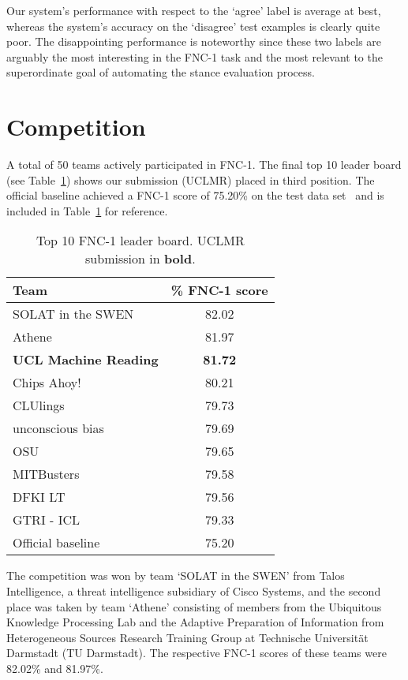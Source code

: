 \documentclass{article}
\begin{document}
Our system's performance with respect to the `agree' label is average at best, whereas the system's accuracy on the `disagree' test examples is clearly quite poor. The disappointing performance is noteworthy since these two labels are arguably the most interesting in the FNC-1 task and the most relevant to the superordinate goal of automating the stance evaluation process.

\section{Competition}
\label{comp}

A total of 50 teams actively participated in FNC-1. The final top 10 leader board (see Table~\ref{tab: leaderboard}) shows our submission (UCLMR) placed in third position. The official baseline achieved a FNC-1 score of 75.20\% on the test data set~\cite{fncbase} and is included in Table~\ref{tab: leaderboard} for reference.

\begin{table}[h]
\caption{Top 10 FNC-1 leader board. UCLMR submission in \textbf{bold}.}
\label{tab: leaderboard}
\centering
\begin{tabular}{lc}
\toprule
Team & \% FNC-1 score \\
\midrule
SOLAT in the SWEN & 82.02 \\
Athene & 81.97 \\
\textbf{UCL Machine Reading} &  \textbf{81.72} \\
Chips Ahoy! & 80.21 \\
CLUlings & 79.73 \\
unconscious bias & 79.69 \\
OSU & 79.65 \\
MITBusters & 79.58 \\
DFKI LT & 79.56 \\
GTRI - ICL & 79.33 \\
\midrule
Official baseline & 75.20 \\
\bottomrule
\end{tabular}
\end{table}

The competition was won by team `SOLAT in the SWEN' from Talos Intelligence, a threat intelligence subsidiary of Cisco Systems, and the second place was taken by team `Athene' consisting of members from the Ubiquitous Knowledge Processing Lab and the Adaptive Preparation of Information from Heterogeneous Sources Research Training Group at Technische Universität Darmstadt (TU Darmstadt). The respective FNC-1 scores of these teams were 82.02\% and 81.97\%.
\end{document}
